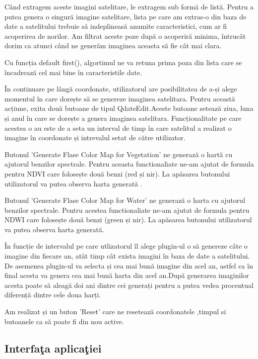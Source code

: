 \documentclass[12pt,a4paper]{article}
\theoremstyle{definition}
\theoremstyle{remark}
\begin{document}
Când extragem aceste imagini satelitare, le extragem sub formă de listă. Pentru a putea genera o singură imagine satelitare, lista pe care am extras-o din baza de date a satelitului trebuie să indeplineasă anumite caracteristici, cum ar fi acoperirea de norilor. Am filtrat aceste poze după o acoperiră minima, întrucât dorim ca atunci când ne generăm imaginea aceasta să fie cât mai clara.

Cu funcția default first(), algortimul ne va retuna prima poza din lista care se încadrează cel mai bine în caracteristile date.


În continuare pe lângă coordonate, utilizatorul are posibilitatea de a-și alege momentul în care dorește să se genereze imaginea satelitara. Pentru această acțiune, exita două butoane de tipul QdateEdit.Aceste butoane setează ziua, luna și anul în care se dorește a  genera imaginea satelitara. Funcționalitate pe care acestea o au este de a seta un interval de timp în care satelitul a  realizat o imagine în coordonate și intrevalul setat de către utilizator.

Butonul 'Generate Flase Color Map for Vegetation' ne generază o hartă cu ajutorul benzilor spectrale. Pentru aceasta functionaliate ne-am ajutat de formula pentru NDVI care folosește două benzi (red și nir). La apăsarea butonului utilizatorul va putea observa harta generată .

Butonul 'Generate Flase Color Map for Water' ne generază o harta cu ajutorul benzilor spectrale. Pentru acestea functionaliate ne-am ajutat de formula pentru NDWI care folosește două benzi (green și nir). La apăsarea butonului utilizatorul va putea observa harta generată.

În funcție de intervalul pe care utlizatorul îl alege plugin-ul o să genereze câte o imagine din fiecare an, atât timp cât exista imagini în baza de date a satelitului. De asemenea plugin-ul va selecta și cea mai bună imagine din acel an, astfel ca în final acesta va genera cea mai bună harta din acel an.După generarea imaginilor acesta poate să aleagă doi ani dintre cei generați pentru a putea vedea procentual diferență dintre cele doua harți.

Am realizat și un buton 'Reset' care ne resetează coordonatele ,timpul si butoanele ca să poate fi din nou active.


\subsection{Interfa\c ta aplica\c tiei}
\end{document}
